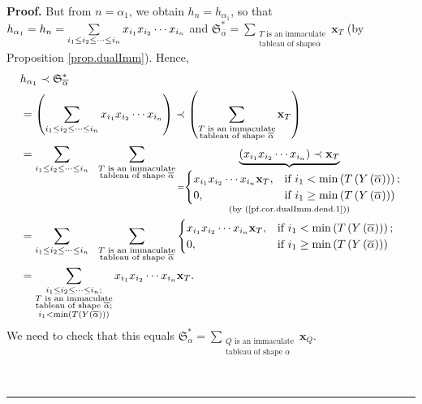 \documentclass
[numbers=enddot,12pt,final,onecolumn,notitlepage,abstracton]{scrartcl}%
\theoremstyle{definition}
\newenvironment{proof}[1][Proof]{\noindent\textbf{#1.} }{\ \rule{0.5em}{0.5em}}
\newenvironment{verlong}{}{}
\let\sumnonlimits\sum
\renewcommand{\sum}{\sumnonlimits\limits}
\begin{document}
\begin{proof}
\begin{verlong}
But from $n=\alpha_{1}$, we obtain $h_{n}=h_{\alpha_{1}}$, so that
$h_{\alpha_{1}}=h_{n}=\sum\limits_{i_{1}\leq i_{2}\leq\cdots\leq i_{n}%
}x_{i_{1}}x_{i_{2}}\cdots x_{i_{n}}$ and $\mathfrak{S}_{\overline{\alpha}%
}^{\ast}=\sum_{\substack{T\text{ is an immaculate}\\\text{tableau of shape
}\overline{\alpha}}}\mathbf{x}_{T}$ (by Proposition \ref{prop.dualImm}).
Hence,%
\begin{align}
&  h_{\alpha_{1}}\left.  \prec\right.  \mathfrak{S}_{\overline{\alpha}}^{\ast
}\nonumber\\
&  =\left(  \sum\limits_{i_{1}\leq i_{2}\leq\cdots\leq i_{n}}x_{i_{1}}%
x_{i_{2}}\cdots x_{i_{n}}\right)  \left.  \prec\right.  \left(  \sum
_{\substack{T\text{ is an immaculate}\\\text{tableau of shape }\overline
{\alpha}}}\mathbf{x}_{T}\right) \nonumber\\
&  =\sum\limits_{i_{1}\leq i_{2}\leq\cdots\leq i_{n}}\ \ \sum
_{\substack{T\text{ is an immaculate}\\\text{tableau of shape }\overline
{\alpha}}}\underbrace{\left(  x_{i_{1}}x_{i_{2}}\cdots x_{i_{n}}\right)
\left.  \prec\right.  \mathbf{x}_{T}}_{\substack{=%
\begin{cases}
x_{i_{1}}x_{i_{2}}\cdots x_{i_{n}}\mathbf{x}_{T}, & \text{if }i_{1}%
<\min\left(  T\left(  Y\left(  \overline{\alpha}\right)  \right)  \right)  ;\\
0, & \text{if }i_{1}\geq\min\left(  T\left(  Y\left(  \overline{\alpha
}\right)  \right)  \right)
\end{cases}
\\\text{(by (\ref{pf.cor.dualImm.dend.1}))}}}\nonumber\\
&  =\sum\limits_{i_{1}\leq i_{2}\leq\cdots\leq i_{n}}\ \ \sum
_{\substack{T\text{ is an immaculate}\\\text{tableau of shape }\overline
{\alpha}}}%
\begin{cases}
x_{i_{1}}x_{i_{2}}\cdots x_{i_{n}}\mathbf{x}_{T}, & \text{if }i_{1}%
<\min\left(  T\left(  Y\left(  \overline{\alpha}\right)  \right)  \right)  ;\\
0, & \text{if }i_{1}\geq\min\left(  T\left(  Y\left(  \overline{\alpha
}\right)  \right)  \right)
\end{cases}
\nonumber\\
&  =\sum\limits_{\substack{i_{1}\leq i_{2}\leq\cdots\leq i_{n};\\T\text{ is an
immaculate}\\\text{tableau of shape }\overline{\alpha};\\i_{1}<\min\left(
T\left(  Y\left(  \overline{\alpha}\right)  \right)  \right)  }}x_{i_{1}%
}x_{i_{2}}\cdots x_{i_{n}}\mathbf{x}_{T}. \label{pf.cor.dualImm.dend.RHS}%
\end{align}
We need to check that this equals $\mathfrak{S}_{\alpha}^{\ast}=\sum
_{\substack{Q\text{ is an immaculate}\\\text{tableau of shape }\alpha
}}\mathbf{x}_{Q}$.
\end{verlong}


\end{proof}
\end{document}
